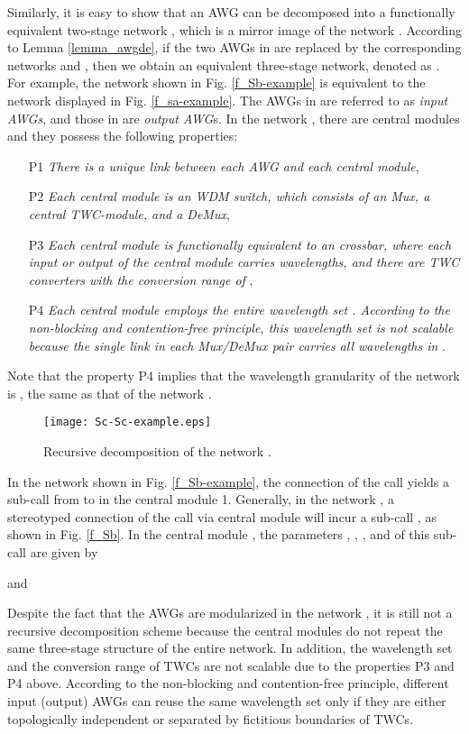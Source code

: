 \documentclass[journal]{IEEEtran}
\begin{document}
Similarly, it is easy to show that an  AWG can be
decomposed into a functionally equivalent two-stage network
, which is a mirror image of the network
. According to Lemma \ref{lemma_awgde}, if
the two AWGs in  are replaced by the
corresponding networks  and
, then we obtain an equivalent three-stage
network, denoted as . For example, the
network  shown in Fig. \ref{f_Sb-example} is
equivalent to the network  displayed in Fig.
\ref{f_sa-example}. The  AWGs in
 are referred to as \emph{input AWGs}, and
those in  are \emph{output AWG}s. In the
network , there are  central modules
and they possess the following properties:
\begin{itemize}
[]
\item[P1] \emph{There is a unique link between each  AWG and each central
module},
\item[P2] \emph{Each central module is an  WDM switch, which consists of an  Mux, a central TWC-module, and a  DeMux},
\item[P3] \emph{Each central module is functionally equivalent to an  crossbar, where each input or output of the central module carries  wavelengths, and there are  TWC converters with the conversion range of },
\item[P4] \emph{Each central module employs the entire wavelength set . According to the non-blocking and contention-free principle, this wavelength set  is not scalable because the single link in each Mux/DeMux pair carries all wavelengths in }.
\end{itemize}
Note that the property P4 implies that the wavelength granularity of
the network  is , the same as
that of the network .

\begin{figure*}[t]
\centering
\texttt{[image: Sc-Sc-example.eps]}
\caption{Recursive decomposition of the network
.}\label{f_Sc-Sc-example}
\end{figure*}

In the network  shown in Fig.
\ref{f_Sb-example}, the connection of the call
 yields a sub-call from 
to  in the central module 1. Generally, in the
network , a stereotyped connection of
the call  via central module
 will incur a sub-call , as
shown in Fig. \ref{f_Sb}. In the central module , the
parameters , , , and  of this sub-call are given by



and


Despite the fact that the AWGs are modularized in the network
, it is still not a recursive
decomposition scheme because the central modules do not repeat the
same three-stage structure of the entire network. In addition, the
wavelength set and the conversion range of TWCs are not scalable due
to the properties P3 and P4 above. According to the non-blocking and
contention-free principle, different input (output) AWGs can reuse
the same wavelength set only if they are either topologically
independent or separated by fictitious boundaries of TWCs.
\end{document}
